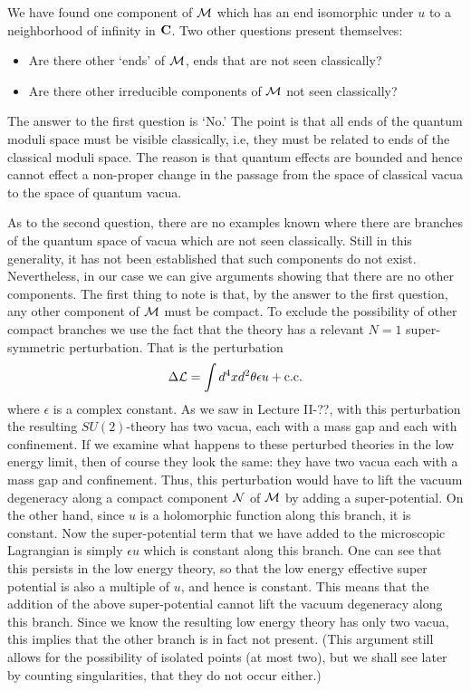 \documentclass[10pt]{article}
\begin{document}
We have found one component of ${\cal M}$ which has an end
isomorphic under $u$ to a neighborhood of infinity in 
${\bf C}$.
Two other questions present themselves:
\begin{itemize}
\item Are there other `ends' of ${\cal M}$, ends that are not seen
classically?
\item Are there other irreducible components of ${\cal M}$ not seen
classically?  
\end{itemize}

The answer to the first question is `No.' The point is that all ends
of the quantum moduli space must be visible classically, i.e, they
must be related to ends of the classical moduli space.  The reason is
that quantum effects are bounded and hence cannot effect a non-proper
change in the passage from the space of classical vacua to the space
of quantum vacua.

As to the second question,
there are no examples known 
where there are branches of the quantum space of vacua which are not
seen classically.  Still in this generality, it has not been
established that such components do not exist.  Nevertheless, in our
case we can give arguments  showing
that there are no other components.
The first thing to note is that, by the answer to the first question,
any other component of ${\cal M}$ must 
be compact. 
To exclude the possibility of other compact branches we use the fact
that the theory has a relevant $N=1$ super-symmetric perturbation.
That is the perturbation
$$\Delta{\cal L}=\int d^4xd^2\theta \epsilon u+{\rm c.c.}$$
where $\epsilon$ is a complex constant.
As we saw in Lecture II-??, with this perturbation the resulting
$SU(2)$-theory 
has two vacua, each with a mass gap and each with confinement.
If we examine  what happens to these perturbed theories in the low energy
limit, then of course they look the same: they have two vacua each
with a mass gap and confinement.  Thus, this perturbation would have to lift
the vacuum degeneracy along a compact 
component ${\cal N}$ of ${\cal M}$ by adding a super-potential.
On the other hand, since $u$ is a holomorphic function along this
branch, it is constant. Now the super-potential term that we have added
to the microscopic Lagrangian is simply $\epsilon u$ which is constant
along this branch. One can see that this persists in the low energy
theory, so that the low energy effective super potential is also a
multiple of $u$, and hence is constant.  This means that the addition
of the above super-potential cannot lift the vacuum degeneracy along
this branch.  Since we  know the resulting low energy theory has only
two vacua, this implies that the other branch is in fact not present.
(This argument still allows for the possibility of isolated points (at
most two), but we shall see later by counting singularities, that they do
not occur either.) 
\end{document}
